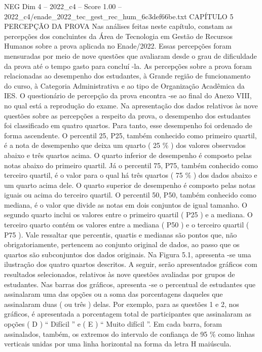 \begin{textsample}{NEG Dim 4 – 2022\_c4 – Score 1.00 – 2022\_c4/enade\_2022\_tec\_gest\_rec\_hum\_6c3def66be.txt}  \label{ex:f4_neg_211}
CAPÍTULO 5 PERCEPÇÃO DA PROVA Nas análises feitas neste capítulo, constam as percepções dos concluintes da Área de Tecnologia em Gestão de Recursos Humanos sobre a prova aplicada no Enade/2022.
Essas percepções foram mensuradas por meio de nove questões que avaliaram desde o grau de dificuldade da prova até o tempo gasto para concluí -la.
As percepções sobre a prova foram relacionadas ao desempenho dos estudantes, à Grande região de funcionamento do curso, à Categoria Administrativa e ao tipo de Organização Acadêmica da IES.
O questionário de percepção da prova encontra -se ao final do Anexo VIII, no qual está a reprodução do exame.
Na apresentação dos dados relativos às nove questões sobre as percepções a respeito da prova, o desempenho dos estudantes foi classificado em quatro quartos.
Para tanto, esse desempenho foi ordenado de forma ascendente.
O percentil 25, P25, também conhecido como primeiro quartil, é a nota de desempenho que deixa um quarto ( 25 \% ) dos valores observados abaixo e três quartos acima.
O quarto inferior de desempenho é composto pelas notas abaixo do primeiro quartil.
Já o percentil 75, P75, também conhecido como terceiro quartil, é o valor para o qual há três quartos ( 75 \% ) dos dados abaixo e um quarto acima dele.
O quarto superior de desempenho é composto pelas notas iguais ou acima do terceiro quartil.
O percentil 50, P50, também conhecido como mediana, é o valor que divide as notas em dois conjuntos de igual tamanho.
O segundo quarto inclui os valores entre o primeiro quartil ( P25 ) e a mediana.
O terceiro quarto contém os valores entre a mediana ( P50 ) e o terceiro quartil ( P75 ).
Vale ressaltar que percentis, quartis e medianas são pontos que, não obrigatoriamente, pertencem ao conjunto original de dados, ao passo que os quartos são subconjuntos dos dados originais.
Na Figura 5.1, apresenta -se uma ilustração dos quatro quartos descritos.
A seguir, serão apresentados gráficos com resultados selecionados, relativos às nove questões avaliadas por grupos de estudantes.
Nas barras dos gráficos, apresenta -se o percentual de estudantes que assinalaram uma das opções ou a soma das porcentagens daqueles que assinalaram duas ( ou três ) delas.
Por exemplo, para as questões 1 e 2, nos gráficos, é apresentada a porcentagem total de participantes que assinalaram as opções ( D ) “ Difícil ” e ( E ) “ Muito difícil ”.
Em cada barra, foram assinalados, também, os extremos do intervalo de confiança de 95 \% como linhas verticais unidas por uma linha horizontal na forma da letra H maiúscula.

\end{textsample}
